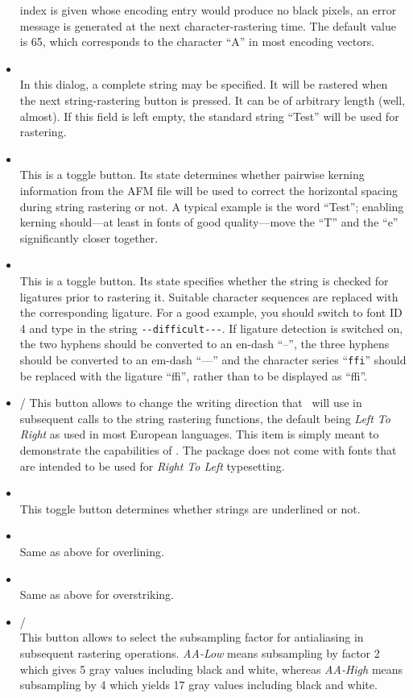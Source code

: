 \begin{itemize}
  index is given whose encoding entry would produce no black pixels,
  an error message is generated at the next character-rastering
  time. The default value is 65, which corresponds 
  to the character ``A'' in most encoding vectors.
\item {}\\
  In this dialog, a complete string may be specified. It will be
  rastered when the next string-rastering button is pressed. It can be
  of arbitrary length (well, almost). If this field is left empty, the
  standard string ``Test'' will be used for rastering.
\item {}\\
  This is a toggle button. Its state determines whether pairwise
  kerning information from the AFM file will be used to correct the
  horizontal spacing during string rastering or not. A typical example
  is the word ``Test''; enabling kerning should---at least in
  fonts of good quality---move the ``T'' and the ``e'' significantly
  closer together.
\item {}\\
  This is a toggle button. Its state specifies whether the
  string is checked for ligatures prior to rastering it. 
  Suitable character sequences are replaced with the corresponding
  ligature. For a good example, you should switch to
  font ID 4 and type in the string \verb+--difficult---+. If ligature
  detection is switched on, the two hyphens should be converted to an
  en-dash ``--'', the three hyphens should be converted to an em-dash
  ``---'' and the character series ``\verb+ffi+'' should be replaced
  with the ligature ``ffi'', rather than to be displayed as ``f{}f{}i''.
\item \fbox{$|\longrightarrow$} / \fbox{$\longleftarrow|$}  This button allows
  to change the writing direction that \tonelib\ will use in subsequent calls
  to the string rastering functions, the default being {\em Left To Right} as
  used in most European languages. This item is simply meant to demonstrate the
  capabilities of \tonelib. The package does not come with fonts that are
  intended to be used for {\em Right To Left} typesetting.
\item {}\\
  This toggle button determines whether strings are underlined or not. 
\item {}\\
  Same as above for overlining.
\item {}\\
  Same as above for overstriking.
\item {}/\\
  This button allows to select the subsampling factor for antialiasing in
  subsequent rastering operations. {\em AA-Low} means subsampling by factor 2
  which gives 5 gray values including black and white, whereas {\em AA-High}
  means subsampling by 4 which yields 17 gray values including black and
  white.  
\end{itemize}

